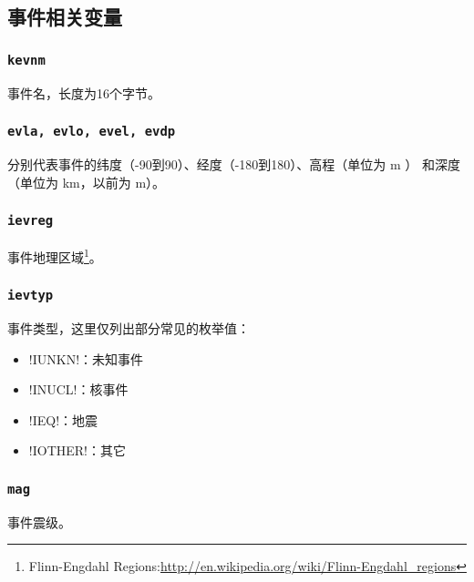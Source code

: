 \subsection{事件相关变量}
\subsubsection{\texttt{kevnm}}
事件名，长度为16个字节。

\subsubsection{\texttt{evla, evlo, evel\dag, evdp}}
分别代表事件的纬度（-90到90）、经度（-180到180）、高程（单位为 \si{\m} ）
和深度（单位为 \si{\km}，以前为 \si{\m}）。

\subsubsection{\texttt{ievreg}\dag}
事件地理区域\footnote{Flinn-Engdahl Regions:\url{http://en.wikipedia.org/wiki/Flinn-Engdahl_regions}}。

\subsubsection{\texttt{ievtyp}}
事件类型，这里仅列出部分常见的枚举值：
\begin{itemize}
\item !IUNKN!：未知事件
\item !INUCL!：核事件
\item !IEQ!：地震
\item !IOTHER!：其它
\end{itemize}

\subsubsection{\texttt{mag}}
事件震级。

